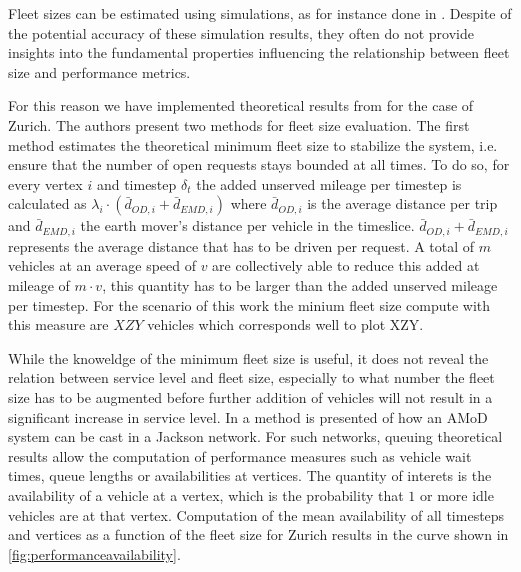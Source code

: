 Fleet sizes can be estimated using simulations, as for instance done in \citep{bischoff2016simulation}. Despite of the potential accuracy of these simulation results, they often do not provide insights into the fundamental properties influencing the relationship between fleet size and performance metrics.

For this reason we have implemented theoretical results from \citep{spieser2014toward} for the case of Zurich. The authors present two methods for fleet size evaluation. The first method estimates the theoretical minimum fleet size to stabilize the system, i.e. ensure that the number of open requests stays bounded at all times. To do so, for every vertex $i$ and timestep $\delta_t$ the added unserved mileage per timestep is calculated as $\lambda_i \cdot ( \bar{d}_{OD,i}  + \bar{d}_{EMD,i})$ where $\bar{d}_{OD,i}$ is the average distance per trip and  $\bar{d}_{EMD,i}$ the earth mover's distance per vehicle in the timeslice. $\bar{d}_{OD,i}  + \bar{d}_{EMD,i}$ represents the average distance that has to be driven per request. A total of $m$ vehicles at an average speed of $v$ are collectively able to reduce this added at mileage of $m \cdot v$, this quantity has to be larger than the added unserved mileage per timestep. For the scenario of this work the minium fleet size compute with this measure are $XZY $ vehicles which corresponds well to plot XZY.

While the knoweldge of the minimum fleet size is useful, it does not reveal the relation between service level and fleet size, especially to what number the fleet size has to be augmented before further addition of vehicles will not result in a significant increase in service level. In \citep{zhang2016control} a method is presented of how an AMoD system can be cast in a Jackson network. For such networks, queuing theoretical results allow the computation of performance measures such as vehicle wait times, queue lengths or availabilities at vertices. The quantity of interets is the availability of a vehicle at a vertex, which is the probability that $1$ or more idle vehicles are at that vertex. Computation of the mean availability of all timesteps and vertices as a function of the fleet size for Zurich results in the curve shown in \ref{fig:performanceavailability}.

